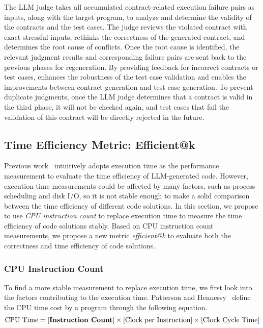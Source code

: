 The LLM judge takes all accumulated contract-related execution failure pairs as inputs, along with the target program, to analyze and determine the validity of the contracts and the test cases. The judge reviews the violated contract with exact stressful inputs, rethinks the correctness of the generated contract, and determines the root cause of conflicts. Once the root cause is identified, the relevant judgment results and corresponding failure pairs are sent back to the previous phases for regeneration. By providing feedback for incorrect contracts or test cases, \tool enhances the robustness of the test case validation and enables the improvements between contract generation and test case generation. To prevent duplicate judgments, once the LLM judge determines that a contract is valid in the third phase, it will not be checked again, and test cases that fail the validation of this contract will be directly rejected in the future.



\subsection{Time Efficiency Metric: Efficient@k}\label{sec:metric}

Previous work~\cite{shypula2024learning,effibench} intuitively adopts execution time as the performance measurement to evaluate the time efficiency of LLM-generated code. However, execution time measurements could be affected by many factors, such as process scheduling and disk I/O, so it is not stable enough to make a solid comparison between the time efficiency of different code solutions. In this section, we propose to use \textit{CPU instruction count} to replace execution time to measure the time efficiency of code solutions stably. Based on CPU instruction count measurements, we propose a new metric \textit{efficient@k} to evaluate both the correctness and time efficiency of code solutions.


\subsubsection{CPU Instruction Count} To find a more stable measurement to replace execution time, we first look into the factors contributing to the execution time. Patterson and Hennessy~\cite{arch} define the CPU time cost by a program through the following equation.
\begin{equation}\label{eq:cic}
    \text{CPU Time} = [\textbf{\text{Instruction Count}}] \times [\text{Clock per Instruction}] \times [\text{Clock Cycle Time}]
\end{equation}

